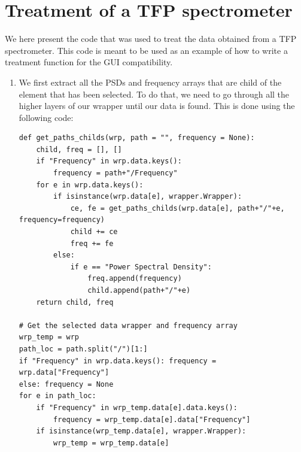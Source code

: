 \documentclass{book}
\begin{document}
    \section{Treatment of a TFP spectrometer} \label{subsec:example_treatment.TFP}

        \begin{tcolorbox}
            We here present the code that was used to treat the data obtained from a TFP spectrometer. This code is meant to be used as an example of how to write a treatment function for the GUI compatibility. 
        \end{tcolorbox}

        \begin{enumerate}
            \item We first extract all the PSDs and frequency arrays that are child of the element that has been selected. To do that, we need to go through all the higher layers of our wrapper until our data is found. This is done using the following code:
\begin{lstlisting}
def get_paths_childs(wrp, path = "", frequency = None):
    child, freq = [], []
    if "Frequency" in wrp.data.keys():
        frequency = path+"/Frequency"
    for e in wrp.data.keys():
        if isinstance(wrp.data[e], wrapper.Wrapper):
            ce, fe = get_paths_childs(wrp.data[e], path+"/"+e, frequency=frequency)
            child += ce
            freq += fe
        else:
            if e == "Power Spectral Density":
                freq.append(frequency)
                child.append(path+"/"+e)
    return child, freq
        
# Get the selected data wrapper and frequency array
wrp_temp = wrp
path_loc = path.split("/")[1:]
if "Frequency" in wrp.data.keys(): frequency = wrp.data["Frequency"]
else: frequency = None
for e in path_loc: 
    if "Frequency" in wrp_temp.data[e].data.keys(): 
        frequency = wrp_temp.data[e].data["Frequency"]
    if isinstance(wrp_temp.data[e], wrapper.Wrapper): 
        wrp_temp = wrp_temp.data[e]


\end{lstlisting}
\end{enumerate}
\end{document}
